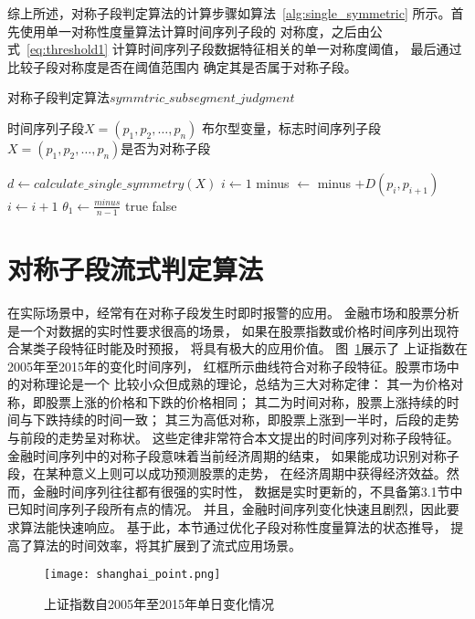 综上所述，对称子段判定算法的计算步骤如算法~\ref{alg:single_symmetric}
所示。首先使用单一对称性度量算法计算时间序列子段的
对称度，之后由公式~\ref{eq:threshold1}
计算时间序列子段数据特征相关的单一对称度阈值，
最后通过比较子段对称度是否在阈值范围内
确定其是否属于对称子段。

\renewcommand{\algorithmicrequire}{\textbf{输入：}\unskip}
\renewcommand{\algorithmicensure}{\textbf{输出：}\unskip}
\begin{algorithm}
  \caption{对称子段判定算法$symmtric\_subsegment\_judgment$}
  \label{alg:single_symmetric}
  \small
  \begin{algorithmic}
    \REQUIRE 时间序列子段$X=\left(p_{1}, p_{2}, \dots, p_{n}\right)$
    \ENSURE 布尔型变量，标志时间序列子段$X=\left(p_{1},p_{2},\dots,p_n \right)$是否为对称子段

    \STATE $d \leftarrow calculate\_single\_symmetry(X) $
    \STATE $i \leftarrow 1$
    \STATE minus $\leftarrow$ minus $+D\left(p_{i}, p_{i+1}\right)$
    \STATE $i \leftarrow i+1$
    \ENDWHILE
    \STATE $\theta_1 \leftarrow \frac{minus}{n-1}$
      \RETURN true
    \ELSE
      \RETURN false
    \ENDIF
  \end{algorithmic}
\end{algorithm}


\section{对称子段流式判定算法}
在实际场景中，经常有在对称子段发生时即时报警的应用\cite{2022968}。
金融市场和股票分析是一个对数据的实时性要求很高的场景，
如果在股票指数或价格时间序列出现符合某类子段特征时能及时预报，
将具有极大的应用价值\cite{DBLP:journals/jucs/BeheraDRMD20}。
图~\ref{fig:shanghai_point}展示了
上证指数在2005年至2015年的变化时间序列，
红框所示曲线符合对称子段特征。股票市场中的对称理论是一个
比较小众但成熟的理论，总结为三大对称定律：
其一为价格对称，即股票上涨的价格和下跌的价格相同；
其二为时间对称，股票上涨持续的时间与下跌持续的时间一致；
其三为高低对称，即股票上涨到一半时，后段的走势与前段的走势呈对称状。
这些定律非常符合本文提出的时间序列对称子段特征。
金融时间序列中的对称子段意味着当前经济周期的结束，
如果能成功识别对称子段，在某种意义上则可以成功预测股票的走势，
在经济周期中获得经济效益。然而，金融时间序列往往都有很强的实时性，
数据是实时更新的，不具备第3.1节中已知时间序列子段所有点的情况。
并且，金融时间序列变化快速且剧烈，因此要求算法能快速响应。
基于此，本节通过优化子段对称性度量算法的状态推导，
提高了算法的时间效率，将其扩展到了流式应用场景。
\begin{figure}
  \centering
  \texttt{[image: shanghai\_point.png]}
  \caption{上证指数自2005年至2015年单日变化情况}
  \label{fig:shanghai_point}
\end{figure}

